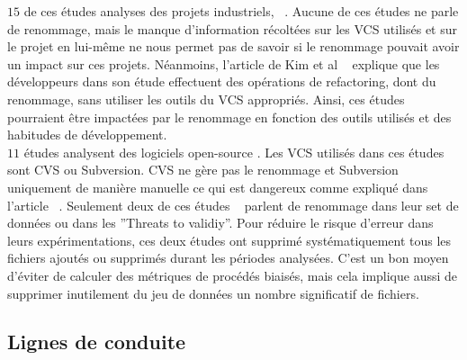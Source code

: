 $15$ de ces études analyses des projets industriels, ~\cite{arisholm_systematic_2010,graves_predicting_2000,khoshgoftaar_using_2000,layman_iterative_2008,munson_code_1998,nagappan_use_2005,nagappan_influence_2008,nagappan_using_2007,nagappan_using_2006,nagappan_change_2010,nikora_building_2006,ostrand_programmer-based_2010,weyuker_too_2008,weyuker_using_2007,yuan_application_2000}. Aucune de ces études ne parle de renommage, mais le manque d'information récoltées sur les VCS utilisés et sur le projet en lui-même ne nous permet pas de savoir si le renommage pouvait avoir un impact sur ces projets. Néanmoins, l'article de Kim et al ~\cite{kim_field_2012} explique que les développeurs dans son étude effectuent des opérations de refactoring, dont du renommage, sans utiliser les outils du VCS appropriés. Ainsi, ces études pourraient être impactées par le renommage en fonction des outils utilisés et des habitudes de développement.\\

$11$ études analysent des logiciels open-source \cite{dambros_relationship_2009,bacchelli_are_2010,caglayan_merits_2009,dambros_evaluating_2012,dambros_evaluating_2012,dambros_extensive_2010,illes-seifert_exploring_2010,li_finding_2005,matsumoto_analysis_2010,moser_analysis_2008,moser_comparative_2008,schroter_if_2006}. Les VCS utilisés dans ces études sont CVS ou Subversion. CVS ne gère pas le renommage et Subversion uniquement de manière manuelle ce qui est dangereux comme expliqué dans l'article ~\cite{lavoie_inferring_2012,steidl_incremental_2014}. Seulement deux de ces études ~\cite{moser_analysis_2008,moser_comparative_2008} parlent de renommage dans leur set de données ou dans les ''Threats to validiy''. Pour réduire le risque d'erreur dans leurs expérimentations, ces deux études ont supprimé systématiquement tous les fichiers ajoutés ou supprimés durant les périodes analysées. C'est un bon moyen d'éviter de calculer des métriques de procédés biaisés, mais cela implique aussi de supprimer inutilement du jeu de données un nombre significatif de fichiers.\\

\subsection{Lignes de conduite}
\label{sec:guidelines}

